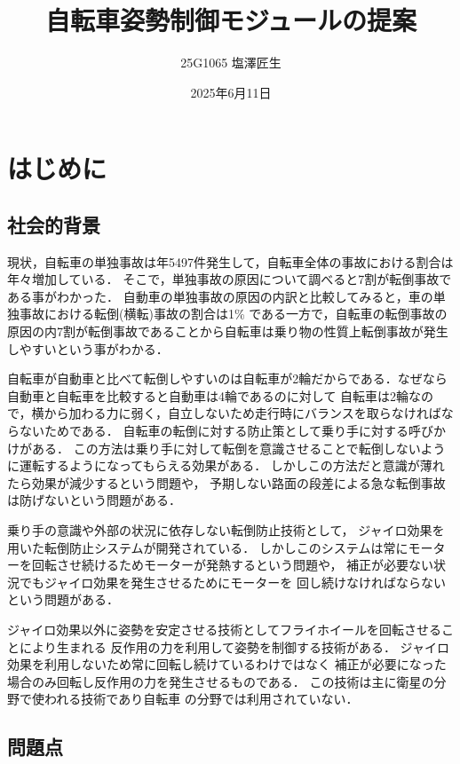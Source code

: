 \documentclass[uplatex,dvipdfmx]{jsarticle}
\begin{document}
\title{自転車姿勢制御モジュールの提案}
\author{25G1065 塩澤匠生}
\date{2025年6月11日}
\maketitle
\section{はじめに}

\subsection{社会的背景}

現状，自転車の単独事故は年5497件発生して，自転車全体の事故における割合は年々増加している\cite{jikokensuu}．
そこで，単独事故の原因について調べると7割が転倒事故である事がわかった\cite{tandokuWariai}．
自動車の単独事故の原因の内訳と比較してみると，車の単独事故における転倒(横転)事故の割合は1\%
である一方で，自転車の転倒事故の原因の内7割が転倒事故であることから自転車は乗り物の性質上転倒事故が発生しやすいという事がわかる．

自転車が自動車と比べて転倒しやすいのは自転車が2輪だからである．なぜなら自動車と自転車を比較すると自動車は4輪であるのに対して
自転車は2輪なので，横から加わる力に弱く，自立しないため走行時にバランスを取らなければな
らないためである．
自転車の転倒に対する防止策として乗り手に対する呼びかけがある．
この方法は乗り手に対して転倒を意識させることで転倒しないよう
に運転するようになってもらえる効果がある．
しかしこの方法だと意識が薄れたら効果が減少するという問題や，
予期しない路面の段差による急な転倒事故は防げないという問題がある．

乗り手の意識や外部の状況に依存しない転倒防止技術として，
ジャイロ効果を用いた転倒防止システムが開発されている\cite{jairo}．
しかしこのシステムは常にモーターを回転させ続けるためモーターが発熱するという問題や，
補正が必要ない状況でもジャイロ効果を発生させるためにモーターを
回し続けなければならないという問題がある．

ジャイロ効果以外に姿勢を安定させる技術としてフライホイールを回転させることにより生まれる
反作用の力を利用して姿勢を制御する技術がある．
ジャイロ効果を利用しないため常に回転し続けているわけではなく
補正が必要になった場合のみ回転し反作用の力を発生させるものである．
この技術は主に衛星の分野で使われる技術であり自転車
の分野では利用されていない．


\subsection{問題点}
\end{document}
